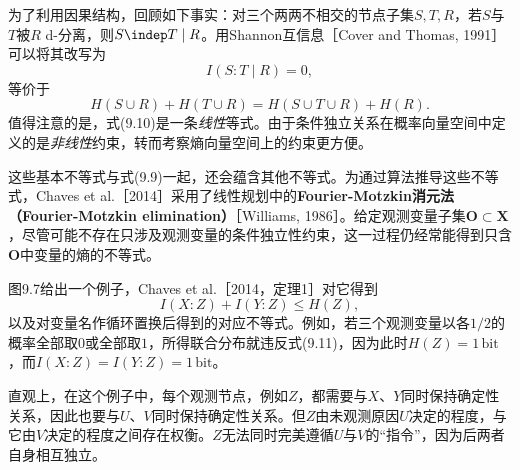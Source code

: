 为了利用因果结构，回顾如下事实：对三个两两不相交的节点子集$S,T,R$，若$S$与$T$被$R$ d-分离，则$S\indep T\mid R$。用Shannon互信息［Cover and Thomas, 1991］可以将其改写为
\begin{equation}
 I(S:T\mid R)=0,\tag{9.9}
\end{equation}
等价于
\begin{equation}
 H(S\cup R)+H(T\cup R)=H(S\cup T\cup R)+H(R).\tag{9.10}
\end{equation}
值得注意的是，式(9.10)是一条\emph{线性}等式。由于条件独立关系在概率向量空间中定义的是\emph{非线性}约束，转而考察熵向量空间上的约束更方便。

这些基本不等式与式(9.9)一起，还会蕴含其他不等式。为通过算法推导这些不等式，Chaves et al.［2014］采用了线性规划中的\textbf{Fourier-Motzkin消元法（Fourier-Motzkin elimination）}［Williams, 1986］。给定观测变量子集$\mathbf O\subset\mathbf X$，尽管可能不存在只涉及观测变量的条件独立性约束，这一过程仍经常能得到只含$\mathbf O$中变量的熵的不等式。

图9.7给出一个例子，Chaves et al.［2014，定理1］对它得到
\begin{equation}
 I(X:Z)+I(Y:Z)\le H(Z),\tag{9.11}
\end{equation}
以及对变量名作循环置换后得到的对应不等式。例如，若三个观测变量以各$1/2$的概率全部取$0$或全部取$1$，所得联合分布就违反式(9.11)，因为此时$H(Z)=1\,\mathrm{bit}$，而$I(X:Z)=I(Y:Z)=1\,\mathrm{bit}$。


直观上，在这个例子中，每个观测节点，例如$Z$，都需要与$X$、$Y$同时保持确定性关系，因此也要与$U$、$V$同时保持确定性关系。但$Z$由未观测原因$U$决定的程度，与它由$V$决定的程度之间存在权衡。$Z$无法同时完美遵循$U$与$V$的“指令”，因为后两者自身相互独立。
\FloatBarrier
